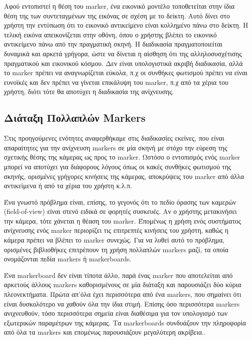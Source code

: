Αφού εντοπιστεί η θέση του marker, ένα εικονικό μοντέλο τοποθετείται στην ίδια θέση της των συντεταγμένων της εικόνας σε σχέση με το δείκτη. Αυτό δίνει στο χρήστη την εντύπωση ότι το εικονικό αντικείμενο είναι κολλημένο πάνω στο δείκτη. Η τελική εικόνα απεικονίζεται στην οθόνη, όπου ο χρήστης βλέπει το εικονικό αντικείμενο πάνω από την πραγματική σκηνή. Η διαδικασία πραγματοποιείται δυναμικά και αρκετά γρήγορα, ώστε να δίνεται η αίσθηση ότι της αλληλοσυσχέτισης πραγματικού και εικονικού κόσμου. Δεν είναι υπολογιστικά ακριβή διαδικασία, αλλά το marker πρέπει να αναγνωρίζεται εύκολα, π.χ οι συνθήκες φωτισμού πρέπει να είναι ευνοϊκές και δεν πρέπει να γίνεται επικάλυψη του marker, π.χ από τα χέρια του χρήστη, διότι τότε θα αποτύχει η διαδικασία της ανίχνευσης. 



\subsection{Διάταξη Πολλαπλών Markers} \label{ssec:markerboard}



Στις προηγούμενες ενότητες αναφερθήκαμε στις διαδικασίες εκείνες, που είναι απαραίτητες για την ανίχνευση markers σε μία σκηνή με στόχο την εύρεση της σχετικής θέσης της κάμερας ως προς το marker. Ωστόσο ο εντοπισμός ενός marker μπορεί να αποτύχει για διάφορους λόγους όπως οι κακές συνθήκες φωτισμού της σκηνής, ορισμένες γρήγορες κινήσεις της κάμερας, αποκρύψεις του marker από άλλα αντικείμενα ή από τα χέρια του χρήστη κ.λ.π. 


Ένα γνωστό πρόβλημα είναι, επίσης, το γεγονός ότι το πεδίο όρασης των καμερών (field-of-view) είναι στενό ειδικά σε φορητές συσκευές. Αν ο χρήστης μετακινήσει την κάμερα, τότε χάνεται η θέαση του marker. Έπομένως η χρήση ενός συστήματος ανίχνευσης ενός marker περιορίζει τις επιτρεπτές κινήσεις του χρήστη, καθώς η κάμερα πρέπει να βλέπει το marker συνεχώς. Για να λυθεί αυτό το πρόβλημα, ορισμένες βιβλιοθήκες επιτρέπουν τη χρήση πολλαπλών markers μαζί, τα οποία ονομάζονται πεδία markers ή markerboards. 


Ένα markerboard δεν είναι τίποτα άλλο, παρά ένας marker που αποτελείται από αρκετούς άλλους markers καθορισμένους σε μία διάταξη και παρουσιάζει δύο κύρια πλεονεκτήματα. Πρώτα απ'όλα έχει περισσότερα από ένα markers, που σημαίνει ότι είναι δυσκολότερο να χαθούν όλα την ίδια στιμή. Επίσης όσο περισσότερα markers ανιχνευθούν, τόσο περισσότερα σημεία είναι διαθέσιμα για τον υπολογισμό των εξωτερικών παραμέτρων της κάμερας. Τα markerboards συνδυάζουν την πληροφορία από όλα τα markers και επομένως παρουσιάζουν μεγαλύτερη ακρίβεια.\cite{yoon2006increasing}.



